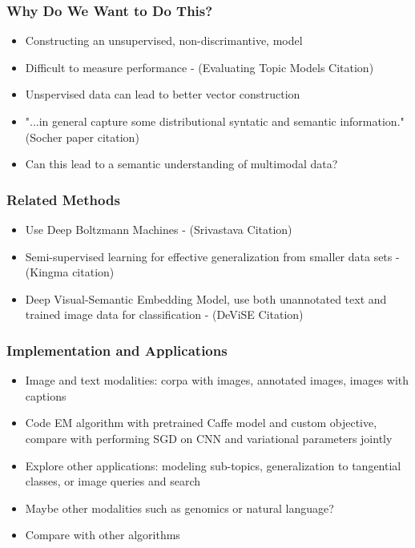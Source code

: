 \documentclass{beamer}
\begin{document}
\begin{frame}
  \frametitle{Why Do We Want to Do This?}
  \begin{itemize}
  \item Constructing an unsupervised, non-discrimantive, model
  \item Difficult to measure performance - (Evaluating Topic Models Citation)
  \item Unspervised data can lead to better vector construction
  \item "...in general capture some distributional syntatic and semantic information." (Socher paper citation)
  \item Can this lead to a semantic understanding of multimodal data?
  \end{itemize}
\end{frame}

\begin{frame}
  \frametitle{Related Methods}
  \begin{itemize}
  \item Use Deep Boltzmann Machines - (Srivastava Citation)
  \item Semi-supervised learning for effective generalization from smaller data sets - (Kingma citation)
  \item Deep Visual-Semantic Embedding Model, use both unannotated text and trained image data for classification - (DeViSE Citation)
  \end{itemize}
\end{frame}

\begin{frame}
  \frametitle{Implementation and Applications}
  \begin{itemize}
  \item Image and text modalities: corpa with images, annotated images, images with captions
  \item Code EM algorithm with pretrained Caffe model and custom objective, compare with performing SGD on CNN and variational parameters jointly
  \item Explore other applications: modeling sub-topics, generalization to tangential classes, or image queries and search
  \item Maybe other modalities such as genomics or natural language?
  \item Compare with other algorithms
  \end{itemize}
\end{frame}

\end{document}
